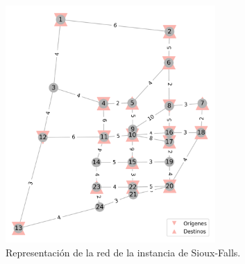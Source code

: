 \documentclass{article}
\begin{document}
  \begin{figure}[h!]
    \centering
    \includegraphics[width=8cm]{../resources/sioux_falls_odpairs.png}
    \caption{Representación de la red de la instancia de Sioux-Falls.}
    \label{fig:siouxfallsapendix}
  \end{figure}
\end{document}
